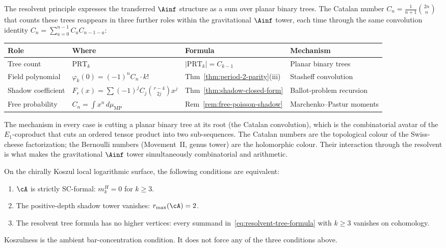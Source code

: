 \begin{remark}
\label{rem:four-pillars-catalan}%
%
%
The resolvent principle expresses the transferred $\Ainf$ structure
as a sum over planar binary trees. The Catalan number
$C_n = \frac{1}{n+1}\binom{2n}{n}$ that counts these trees
reappears in three further roles within the gravitational $\Ainf$
tower, each time through the same convolution identity
$C_n = \sum_{a=0}^{n-1} C_a C_{n-1-a}$:
\begin{center}
\small
\renewcommand{\arraystretch}{1.3}
\begin{tabular}{@{}llll@{}}
\toprule
\textbf{Role} & \textbf{Where} & \textbf{Formula} & \textbf{Mechanism} \\
\midrule
Tree count &
 $\mathrm{PRT}_k$ &
 $|\mathrm{PRT}_k| = C_{k-1}$ &
 Planar binary trees \\
Field polynomial &
 $\varphi_k(0) = (-1)^n C_n \cdot k!$ &
 Thm~\ref{thm:period-2-parity}(iii) &
 Stasheff convolution \\
Shadow coefficient &
 $F_r(x) = \sum (-1)^j C_j \binom{r-4}{2j} x^j$ &
 Thm~\ref{thm:shadow-closed-form} &
 Ballot-problem recursion \\
Free probability &
 $C_n = \int x^n\,d\mu_{\mathrm{MP}}$ &
 Rem~\ref{rem:free-poisson-shadow} &
 Marchenko--Pastur moments \\
\bottomrule
\end{tabular}
\end{center}
The mechanism in every case is cutting a planar binary tree at
its root (the Catalan convolution), which is the combinatorial
avatar of the $E_1$-coproduct that cuts an ordered tensor product
into two sub-sequences. The Catalan numbers are the topological
colour of the Swiss-cheese factorization; the Bernoulli numbers
(Movement~II, genus tower) are the holomorphic colour. Their
interaction through the resolvent is what makes the gravitational
$\Ainf$ tower simultaneously combinatorial and arithmetic.
\end{remark}

\begin{corollary}
\label{cor:koszul-resolvent}
On the chirally Koszul local logarithmic surface, the following
conditions are equivalent:
\begin{enumerate}[label=\textup{(\alph*)}]
\item $\cA$ is strictly SC-formal:
 $m_k^H = 0$ for\/ $k \geq 3$.
\item The positive-depth shadow tower vanishes:
 $r_{\max}(\cA)=2$.
\item The resolvent tree formula has no higher vertices: every
summand in~\eqref{eq:resolvent-tree-formula} with $k\geq3$
vanishes on cohomology.
\end{enumerate}
Koszulness is the ambient bar-concentration condition. It does not
force any of the three conditions above.
\end{corollary}

